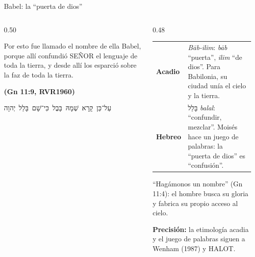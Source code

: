 \documentclass[hyperref={bookmarks=false},aspectratio=169]{beamer}
\newcommand{\heb}[1]{\mbox{\foreignlanguage{hebrew}{#1}}}
\newcommand{\SENOR}{S{\fontsize{0.78em}{1em}\selectfont EÑOR}}
\newcommand{\fuente}[1]{\par\hfill{\upshape\bfseries\footnotesize\textcolor{azul}{#1}}}
\newcommand{\precision}[1]{{\footnotesize\color{gris}\textbf{Precisión:} #1}}
\begin{document}
\begin{frame}{Babel: la ``puerta de dios''}
\begin{columns}[c,onlytextwidth]
\begin{column}{0.50\textwidth}
\begin{cita}Por esto fue llamado el nombre de ella Babel, porque allí confundió \SENOR{} el lenguaje de toda la tierra, y desde allí los esparció sobre la faz de toda la tierra.\fuente{(Gn 11:9, RVR1960)}\end{cita}
\begin{center}\heb{עַל־כֵּן קָרָא שְׁמָהּ בָּבֶל כִּי־שָׁם בָּלַל יְהוָה}\end{center}
\end{column}
\begin{column}{0.48\textwidth}
\scriptsize\renewcommand{\arraystretch}{1.2}
\begin{tabular}{@{}>{\RaggedRight\arraybackslash}p{1.9cm}>{\RaggedRight\arraybackslash}p{3.6cm}@{}}
\toprule
\textbf{Acadio} & \emph{Bāb-ilim}: \emph{bāb} ``puerta'', \emph{ilim} ``de dios''. Para Babilonia, su ciudad unía el cielo y la tierra. \\
\textbf{Hebreo} & \heb{בָּלַל} \emph{balal}: ``confundir, mezclar''. Moisés hace un juego de palabras: la ``puerta de dios'' es ``confusión''. \\
\bottomrule
\end{tabular}\par\medskip
\small ``Hagámonos un nombre'' (Gn 11:4): el hombre busca su gloria y fabrica su propio acceso al cielo.\par\smallskip
\precision{la etimología acadia y el juego de palabras siguen a Wenham (1987) y HALOT.}
\end{column}
\end{columns}
\end{frame}
\end{document}
